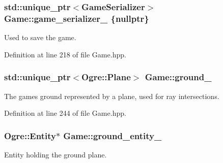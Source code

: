 \subsubsection[{\texorpdfstring{game\+\_\+serializer\+\_\+}{game_serializer_}}]{\setlength{\rightskip}{0pt plus 5cm}std\+::unique\+\_\+ptr$<${\bf Game\+Serializer}$>$ Game\+::game\+\_\+serializer\+\_\+ \{nullptr\}\hspace{0.3cm}{\ttfamily [private]}}\hypertarget{class_game_a27543a5588f79f251f5b4cb64026966f}{}\label{class_game_a27543a5588f79f251f5b4cb64026966f}


Used to save the game. 



Definition at line 218 of file Game.\+hpp.

\subsubsection[{\texorpdfstring{ground\+\_\+}{ground_}}]{\setlength{\rightskip}{0pt plus 5cm}std\+::unique\+\_\+ptr$<$Ogre\+::\+Plane$>$ Game\+::ground\+\_\+\hspace{0.3cm}{\ttfamily [private]}}\hypertarget{class_game_a8e687faa09ca8c2f89279eecbe463916}{}\label{class_game_a8e687faa09ca8c2f89279eecbe463916}


The game\textquotesingle{}s ground represented by a plane, used for ray intersections. 



Definition at line 244 of file Game.\+hpp.

\subsubsection[{\texorpdfstring{ground\+\_\+entity\+\_\+}{ground_entity_}}]{\setlength{\rightskip}{0pt plus 5cm}Ogre\+::\+Entity$\ast$ Game\+::ground\+\_\+entity\+\_\+\hspace{0.3cm}{\ttfamily [private]}}\hypertarget{class_game_a13668cabb42e440fea0f0a2a2b211984}{}\label{class_game_a13668cabb42e440fea0f0a2a2b211984}


Entity holding the ground plane. 

